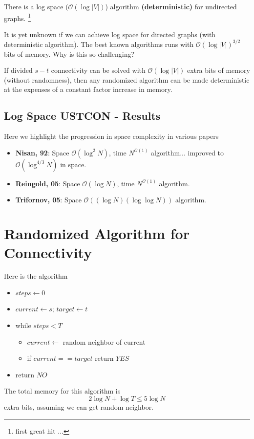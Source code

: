 \documentclass[11pt, letter]{book}
\begin{document}
\begin{proposition}
	There is a log space ($\mathcal O ( \log | V | )$) algorithm \textbf{(deterministic)} for undirected graphs. \footnote{first great hit ...}
\end{proposition}

It is yet unknown if we can achieve log space for directed graphs (with deterministic algorithm). The best known algorithms runs with $\mathcal O (\log |V| ) ^{3/2}$ bits of memory. Why is this so challenging? 

\begin{proposition}
	If divided $s-t$ connectivity can be solved with $\mathcal O (\log |V| )$ extra bits of memory (without randomness), then any randomized algorithm can be made deterministic at the expenses of a constant factor increase in memory. 
\end{proposition}

\subsection{Log Space USTCON - Results}
Here we highlight the progression in space complexity in various papers
\begin{itemize}
	\item \textbf{Nisan, 92}: Space $\mathcal O (\log ^ 2 N)$, time $N ^{\mathcal O (1)}$ algorithm... improved to $\mathcal O (\log ^ {4/3} N)$ in space. 
	\item \textbf{Reingold, 05}: Space $\mathcal O (\log N)$, time $N ^{\mathcal O (1)}$ algorithm. 
	\item \textbf{Trifornov, 05}: Space $\mathcal O ((\log N )(\log\log N))$ algorithm. 
\end{itemize}

\section{Randomized Algorithm for Connectivity}
\begin{algorithm} Here is the algorithm
	\begin{itemize}
		\item $steps \gets 0 $ 
		\item $current \gets s$; $target \gets t$
		\item while $steps < T$
		\begin{itemize}
			\item $current \gets $ random neighbor of current
			\item if $current == target$ return $YES$
		\end{itemize}
		\item return $NO$
	\end{itemize}
\end{algorithm}
The total memory for this algorithm is 
\begin{equation}
	2 \log N + \log T \leq 5 \log N
\end{equation}
extra bits, assuming we can get random neighbor. 
\end{document}

